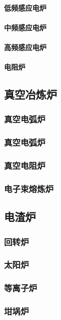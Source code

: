 \documentclass[UTF8]{../../ApplicationUniverse}
\begin{document}
            \paragraph{低频感应电炉}
            \paragraph{中频感应电炉}
            \paragraph{高频感应电炉}
            \paragraph{电阻炉}
    \subsection{真空冶炼炉}
        \subsubsection{真空电弧炉}
        \subsubsection{真空电弧炉}
        \subsubsection{真空电阻炉}
        \subsubsection{电子束熔炼炉}
    \subsection{电渣炉}
        \subsubsection{回转炉}
        \subsubsection{太阳炉}
        \subsubsection{等离子炉}
        \subsubsection{坩埚炉}
\end{document}

